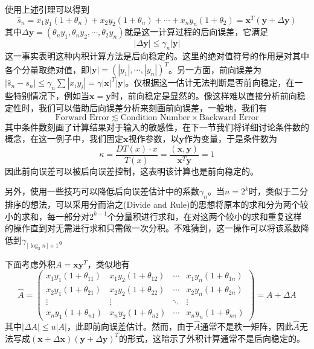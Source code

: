 \documentclass[a4paper,10pt]{ctexart}
\begin{document}
使用上述引理可以得到
\begin{equation}
    \hat{s}_n = x_1y_1(1+\theta_n) + x_2y_2(1+\theta_n) + \cdots + x_n y_n (1+\theta_2) = \bm{x}^T (\bm{y}+\Delta\bm{y})
\end{equation}
其中$ \Delta\bm{y} = (\theta_n y_1, \theta_n y_2, \cdots , \theta_2 y_n) $就是这一计算过程的后向误差，它满足
\[
    |\Delta \bm{y}| \leqslant \gamma_n |\bm{y}|
\]
这一事实表明这种内积计算方法是后向稳定的。这里的绝对值符号的作用是对其中各个分量取绝对值，即$ |\bm{y}| = (|y_1|,\cdots ,|y_n|)^T $。另一方面，前向误差为$ |\hat{s}_n-s_n| \leqslant \gamma_n \sum |x_iy_i| = \gamma |\bm{x}|^T |\bm{y}| $。仅根据这一估计无法判断是否前向稳定，在一些特别情况下，例如当$ \bm{x}=\bm{y} $时，前向稳定是显然的。像这样难以直接分析前向稳定性时，我们可以借助后向误差分析来刻画前向误差，一般地，我们有
\begin{equation}
    \text{Forward Error} \lesssim \text{Condition Number} \times \text{Backward Error}
\end{equation}
其中条件数刻画了计算结果对于输入的敏感性，在下一节我们将详细讨论条件数的概念，在这一例子中，我们固定$ \bm{x} $视作参数，以$ \bm{y} $作为变量，于是条件数为
\[
    \kappa = \frac{DT(x)\cdot x}{T(x)} = \frac{(\bm{x}, \bm{y})}{\bm{x}^T\bm{y}}=1
\]
因此前向误差可以被后向误差控制，这表明该计算也是前向稳定的。

另外，使用一些技巧可以降低后向误差估计中的系数$ \gamma_n $。当$ n=2^k $时，类似于二分排序的想法，可以采用分而治之(Divide and Rule)的思想将原本的求和分为两个较小的求和，每一部分对$ 2^{k-1} $个分量积进行求和，在对这两个较小的求和重复这样的操作直到对无需进行求和只需做一次分积。不难猜到，这一操作可以将该系数降低到$ \gamma_{\lceil \log_2 n \rceil + 1} $。

下面考虑外积$ A=\bm{x} \bm{y}^T $，类似地有
\[
    \hat{A} = \begin{pmatrix}
        x_1y_1(1+\theta_{11}) & x_1y_2(1+\theta_{12}) & \cdots & x_1y_n(1+\theta_{1n}) \\
        x_2y_1(1+\theta_{21}) & x_2y_2(1+\theta_{22}) & \cdots & x_2y_n(1+\theta_{2n}) \\
        \vdots & \vdots & \ddots & \vdots \\
        x_ny_1(1+\theta_{n1}) & x_ny_2(1+\theta_{n2}) & \cdots & x_ny_n(1+\theta_{nn}) 
    \end{pmatrix} = A+\Delta A
\]
其中$ |\Delta A|\leqslant u |A| $，此即前向误差估计。然而，由于$ \hat{A} $通常不是秩一矩阵，因此$ \hat{A} $无法写成$ (\bm{x}+\Delta \bm{x})(\bm{y}+\Delta \bm{y})^T $的形式，这暗示了外积计算通常不是后向稳定的。
\end{document}

